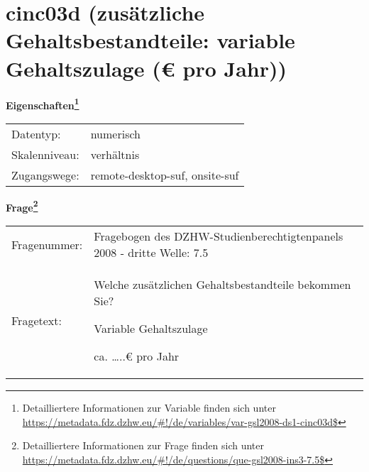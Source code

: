 
    \setcounter{footnote}{0}

    \vspace*{-1.8cm}
	\section{cinc03d (zusätzliche Gehaltsbestandteile: variable Gehaltszulage (€ pro Jahr))}
	\label{section:cinc03d}



    \vspace*{0.5cm}
    \noindent\textbf{Eigenschaften\footnote{Detailliertere Informationen zur Variable finden sich unter
		\url{https://metadata.fdz.dzhw.eu/\#!/de/variables/var-gsl2008-ds1-cinc03d$}}}\\
	\begin{tabularx}{\hsize}{@{}lX}
	Datentyp: & numerisch \\
	Skalenniveau: & verhältnis \\
	Zugangswege: &
	  remote-desktop-suf, 
	  onsite-suf
 \\
    \end{tabularx}



				\vspace*{0.5cm}
                \noindent\textbf{Frage\footnote{Detailliertere Informationen zur Frage finden sich unter
		              \url{https://metadata.fdz.dzhw.eu/\#!/de/questions/que-gsl2008-ins3-7.5$}}}\\
				\begin{tabularx}{\hsize}{@{}lX}
					Fragenummer: &
					  Fragebogen des DZHW-Studienberechtigtenpanels 2008 - dritte Welle:
					  7.5
 \\
					Fragetext: & Welche zusätzlichen Gehaltsbestandteile bekommen Sie?\par  Variable Gehaltszulage\par  ca. …..€ pro Jahr \\
				\end{tabularx}





